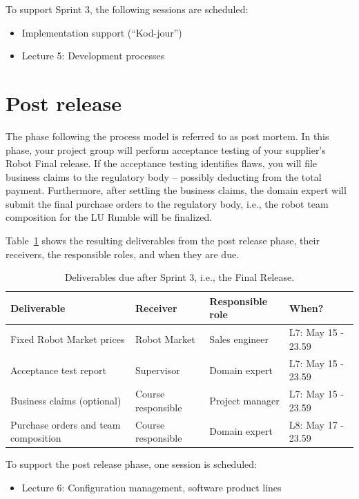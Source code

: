 \documentclass{scrreprt}
\begin{document}
To support Sprint 3, the following sessions are scheduled:
\begin{itemize}
\item Implementation support (``Kod-jour'')
\item Lecture 5: Development processes
\end{itemize}

\section{Post release}
The phase following the process model is referred to as post mortem. In this phase, your project group will perform acceptance testing of your supplier's Robot Final release. If the acceptance testing identifies flaws, you will file business claims to the regulatory body -- possibly deducting from the total payment. Furthermore, after settling the business claims, the domain expert will submit the final purchase orders to the regulatory body, i.e., the robot team composition for the LU Rumble will be finalized.

Table~\ref{tab:postrelease} shows the resulting deliverables from the post release phase, their receivers, the responsible roles, and when they are due.

\begin{table}[] %
\centering
\caption{Deliverables due after Sprint 3, i.e., the Final Release.}
\label{tab:postrelease}
\begin{tabular}{|p{4cm}|p{2cm}|p{2.5cm}|p{4.5cm}|}
\hline
\textbf{Deliverable}           & \textbf{Receiver}   & \textbf{Responsible role} & \textbf{When?}     \\ \hline
Fixed Robot Market prices   & Robot Market          & Sales engineer           & L7: May 15 - 23.59 \\ \hline
Acceptance test report   & Supervisor          & Domain expert           & L7: May 15 - 23.59 \\ \hline
Business claims (optional)                       & Course responsible & Project manager     & L7: May 15 - 23.59 \\ \hline
Purchase orders and team composition       & Course responsible & Domain expert         & L8: May 17 - 23.59  \\ \hline
\end{tabular}
\end{table}

To support the post release phase, one session is scheduled:
\begin{itemize}
\item Lecture 6: Configuration management, software product lines
\end{itemize}
\end{document}
